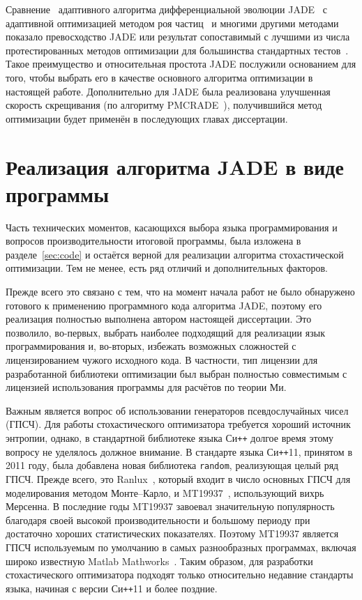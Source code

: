 Сравнение~\cite{Gong-compare-EA-2014,Kang-compare-EA-RABC-2011}
адаптивного алгоритма дифференциальной эволюции
JADE~\cite{Jingqiao-JADE-2009} с адаптивной оптимизацией методом роя
частиц~\cite{Zhan-APSO-2008} и многими другими методами показало
превосходство JADE или результат сопоставимый с лучшими из числа
протестированных методов оптимизации для большинства стандартных
тестов~\cite{Schwefel-1981,Rosenbrock-1960,Muhlenbein-1991,back-1996,Griewank-1981}.
Такое преимущество и относительная простота JADE послужили
основанием для того, чтобы выбрать его в качестве основного алгоритма 
оптимизации в настоящей работе. Дополнительно для JADE была
реализована улучшенная скорость скрещивания (по алгоритму
PMCRADE~\cite{Li-PMCRADE-2011}), получившийся метод оптимизации будет
применён в последующих главах диссертации.



\section{Реализация алгоритма JADE в виде программы}
\label{sec:jade}

Часть технических моментов, касающихся выбора языка программирования и
вопросов производительности итоговой программы, была изложена в
разделе~\ref{sec:code} и остаётся верной для реализации алгоритма
стохастической оптимизации. Тем не менее, есть ряд отличий и
дополнительных факторов.

Прежде всего это связано с тем, что на момент начала работ не было
обнаружено готового к применению программного кода алгоритма JADE, поэтому его
реализация полностью выполнена автором настоящей диссертации. Это
позволило, во-первых, выбрать наиболее подходящий для реализации язык
программирования и, во-вторых, избежать возможных сложностей с
лицензированием чужого исходного кода. В частности, тип лицензии для
разработанной библиотеки оптимизации был выбран полностью
совместимым с лицензией использования программы для расчётов по
теории Ми.

Важным является вопрос об использовании генераторов псевдослучайных
чисел (ГПСЧ). Для работы стохастического оптимизатора требуется
хороший источник энтропии, однако, в стандартной библиотеке языка
Си\texttt{++} долгое время этому вопросу не уделялось должное
внимание. В стандарте языка Си\texttt{++}11, принятом в 2011 году, была
добавлена новая библиотека \verb+random+, реализующая целый ряд
ГПСЧ. Прежде всего, это Ranlux~\cite{Luscher-RNG-Ranlux-1994}, который
входит в число основных ГПСЧ для моделирования методом Монте--Карло, и
MT19937~\cite{Matsumoto-RNG-MT-1998}, использующий вихрь Мерсенна. В
последние годы MT19937 завоевал значительную популярность благодаря
своей высокой производительности и большому периоду при достаточно
хороших статистических показателях. Поэтому MT19937 является ГПСЧ
используемым по умолчанию в самых разнообразных программах, включая
широко известную Matlab Mathworks~\cite{Matlab-web}. Таким образом, для разработки
стохастического оптимизатора подходят только относительно недавние
стандарты языка, начиная с версии Си\texttt{++}11 и более поздние.

